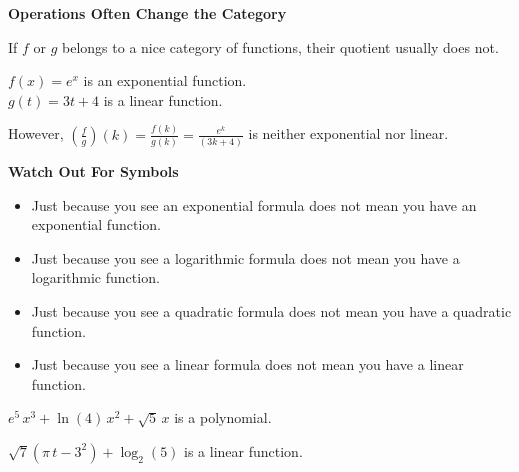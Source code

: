 \documentclass{ximera}
\begin{document}
\begin{warning} \textbf{\textcolor{red!70!black}{Operations Often Change the Category}}

If $f$ or $g$ belongs to a nice category of functions, their quotient usually does not.

\end{warning}





\begin{example}

$f(x) = e^x$ is an exponential function. \\
$g(t) = 3 t + 4$ is a linear function. 

However, $\left(\frac{f}{g}\right)(k) = \frac{f(k)}{g(k)} = \frac{e^k}{(3 k + 4)}$ is neither exponential nor linear.

\end{example}











\begin{warning} \textbf{\textcolor{red!70!black}{Watch Out For Symbols}}


\begin{itemize}
\item Just because you see an exponential formula does not mean you have an exponential function. 
\item Just because you see a logarithmic formula does not mean you have a logarithmic function. 
\item Just because you see a quadratic formula does not mean you have a quadratic function. 
\item Just because you see a linear formula does not mean you have a linear function. 
\end{itemize}

\end{warning}




\begin{example} 

$e^5 \, x^3 + \ln(4) \, x^2 + \sqrt{5} \, x$ is a polynomial.

$\sqrt{7} (\pi \, t - 3^2) + \log_2(5)$ is a linear function.


\end{example}
\end{document}
